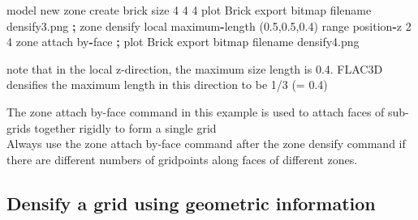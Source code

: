 \documentclass[a4paper, nobind]{templates/ociamthesis}
\newenvironment{Shaded}{\begin{snugshade}}{\end{snugshade}}
\newcommand{\BuiltInTok}[1]{#1}
\newcommand{\DecValTok}[1]{\textcolor[rgb]{0.00,0.00,0.81}{#1}}
\newcommand{\FloatTok}[1]{\textcolor[rgb]{0.00,0.00,0.81}{#1}}
\newcommand{\NormalTok}[1]{#1}
\newcommand{\OperatorTok}[1]{\textcolor[rgb]{0.81,0.36,0.00}{\textbf{#1}}}
\newcommand{\StringTok}[1]{\textcolor[rgb]{0.31,0.60,0.02}{#1}}
\renewenvironment{Shaded}
{
  \vspace{10pt}%
  \begin{snugshade}%
}{%
  \end{snugshade}%
  \vspace{8pt}%
}
\begin{document}
\begin{Shaded}
\begin{Highlighting}[]
\NormalTok{model new}
\NormalTok{zone create brick size }\DecValTok{4} \DecValTok{4} \DecValTok{4}
\NormalTok{plot }\StringTok{\textquotesingle{}Brick\textquotesingle{}}\NormalTok{ export bitmap filename }\StringTok{\textquotesingle{}densify3.png\textquotesingle{}}
\OperatorTok{;}
\NormalTok{zone densify local maximum}\OperatorTok{{-}}\NormalTok{length (}\FloatTok{0.5}\NormalTok{,}\FloatTok{0.5}\NormalTok{,}\FloatTok{0.4}\NormalTok{) }\BuiltInTok{range}\NormalTok{ position}\OperatorTok{{-}}\NormalTok{z }\DecValTok{2} \DecValTok{4}
\NormalTok{zone attach by}\OperatorTok{{-}}\NormalTok{face}
\OperatorTok{;}
\NormalTok{plot }\StringTok{\textquotesingle{}Brick\textquotesingle{}}\NormalTok{ export bitmap filename }\StringTok{\textquotesingle{}densify4.png\textquotesingle{}}
\end{Highlighting}
\end{Shaded}

note that in the local z-direction, the maximum size length is 0.4.
FLAC3D densifies the maximum length in this direction to be 1/3 (= 0.4)

\hfill\break
The zone attach by-face command in this example is used to attach faces
of sub-grids together rigidly to form a single grid\\

Always use the zone attach by-face command after the zone densify
command if there are different numbers of gridpoints along faces of
different zones.

\hypertarget{densify-a-grid-using-geometric-information}{%
\subsection{Densify a grid using geometric information}\label{densify-a-grid-using-geometric-information}}
\end{document}

